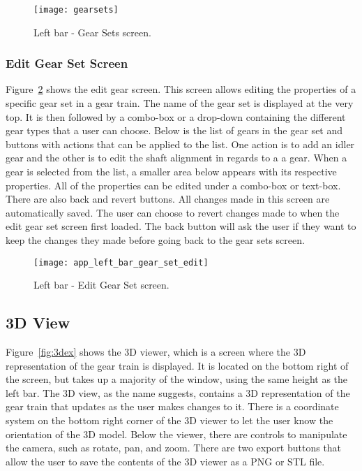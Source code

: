 \begin{doublespace}
\begin{figure}[htbp]
    \centering
    \texttt{[image: gearsets]}
    \caption{Left bar - Gear Sets screen.}
    \label{fig:leftgearsets}
\end{figure}

\subsubsection{Edit Gear Set Screen}

Figure~\ref{fig:lefteditgearset} shows the edit gear screen. This screen allows editing the properties of a specific gear set in a gear train. The name of the gear set is displayed at the very top. It is then followed by a combo-box or a drop-down containing the different gear types that a user can choose. Below is the list of gears in the gear set and buttons with actions that can be applied to the list. One action is to add an idler gear and the other is to edit the shaft alignment in regards to a a gear. When a gear is selected from the list, a smaller area below appears with its respective properties. All of the properties can be edited under a combo-box or text-box. There are also back and revert buttons. All changes made in this screen are automatically saved. The user can choose to revert changes made to when the edit gear set screen first loaded. The back button will ask the user if they want to keep the changes they made before going back to the gear sets screen.

\begin{figure}[htbp]
    \centering
    \texttt{[image: app\_left\_bar\_gear\_set\_edit]}
    \caption{Left bar - Edit Gear Set screen.}
    \label{fig:lefteditgearset}
\end{figure}

\subsection{3D View}

Figure~\ref{fig:3dex} shows the 3D viewer, which is a screen where the 3D representation of the gear train is displayed. It is located on the bottom right of the screen, but takes up a majority of the window, using the same height as the left bar. The 3D view, as the name suggests, contains a 3D representation of the gear train that updates as the user makes changes to it. There is a coordinate system on the bottom right corner of the 3D viewer to let the user know the orientation of the 3D model. Below the viewer, there are controls to manipulate the camera, such as rotate, pan, and zoom. There are two export buttons that allow the user to save the contents of the 3D viewer as a PNG or STL file.


\end{doublespace}
